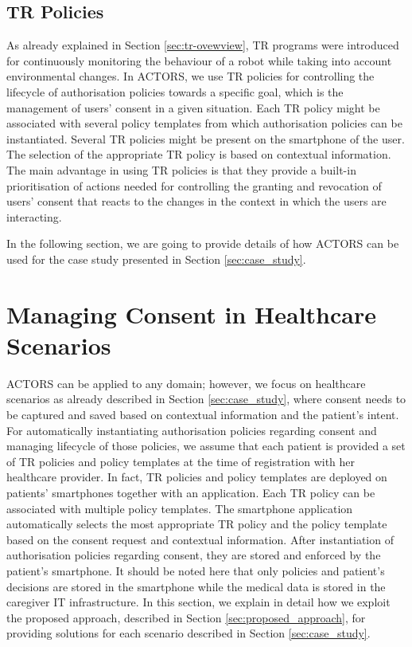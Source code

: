 \documentclass[10pt, conference, compsocconf]{IEEEtran}
\begin{document}
\subsection{TR Policies}
As already explained in Section \ref{sec:tr-ovewview}, TR programs were introduced for continuously monitoring the behaviour of a robot while taking into account environmental changes. In ACTORS, we use TR policies for controlling the lifecycle of authorisation policies towards a specific goal, which is the management of users' consent in a given situation. Each TR policy might be associated with several policy templates from which authorisation policies can be instantiated. Several TR policies might be present on the smartphone of the user. The selection of the appropriate TR policy is based on contextual information. The main advantage in using TR policies is that they provide a built-in prioritisation of actions needed for controlling the granting and revocation of users' consent that reacts to the changes in the context in which the users are interacting.

In the following section, we are going to provide details of how ACTORS can be used for the case study presented in Section \ref{sec:case_study}.


\section{Managing Consent in Healthcare Scenarios}
\label{sec:application}

ACTORS can be applied to any domain; however, we focus on healthcare scenarios as already described in Section \ref{sec:case_study}, where consent needs to be captured and saved based on contextual information and the patient's intent. For automatically instantiating authorisation policies regarding consent and managing lifecycle of those policies, we assume that each patient is provided a set of TR policies and policy templates at the time of registration with her healthcare provider. In fact, TR policies and policy templates are deployed on patients' smartphones together with an application. Each TR policy can be associated with multiple policy templates. The smartphone application automatically selects the most appropriate TR policy and the policy template based on the consent request and contextual information. After instantiation of authorisation policies regarding consent, they are stored and enforced by the patient's smartphone. It should be noted here that only policies and patient's decisions are stored in the smartphone while the medical data is stored in the caregiver IT infrastructure.  In this section, we explain in detail how we exploit the proposed approach, described in Section \ref{sec:proposed_approach}, for providing solutions for each scenario described in Section \ref{sec:case_study}.
\end{document}
